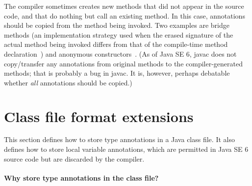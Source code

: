 \documentclass[10pt]{article}
\begin{document}
The compiler sometimes creates new methods that did not appear in the
source code, and that do nothing but call an existing method.  In this
case, annotations should be copied from the method being invoked.
Two examples are bridge methods (an implementation strategy used when the
erased signature of the actual method being invoked differs from that of
the compile-time method declaration~\cite[\S15.12.4.5]{GoslingJSB2005}) and
anonymous constructors~\cite[\S15.9.5.1]{GoslingJSB2005}.
(As of Java SE 6, javac does not copy/transfer any annotations from
original methods to the compiler-generated methods; that is probably a bug
in javac.  It is, however, perhaps debatable whether \emph{all} annotations
should be copied.)


\section{Class file format extensions\label{class-file}}

\newcommand{\RuntimeVisibleAnnotations}{\code{Runtime\-Visible\-Annotations}\xspace}
\newcommand{\RuntimeInvisibleAnnotations}{\code{Runtime\-Invisible\-Annotations}\xspace}
\newcommand{\RuntimeInOrVisibleAnnotations}{\code{Runtime}\-[\code{In}]\code{visible\-Annotations}\xspace}
\newcommand{\RuntimeVisibleParameterAnnotations}{\code{Runtime\-Visible\-Parameter\-Annotations}\xspace}
\newcommand{\RuntimeInvisibleParameterAnnotations}{\code{Runtime\-Invisible\-Parameter\-Annotations}\xspace}
\newcommand{\RuntimeInOrVisibleParameterAnnotations}{\code{Runtime}\-[\code{In}]\code{visible\-Parameter\-Annotations}\xspace}
\newcommand{\RuntimeVisibleTypeAnnotations}{\code{Runtime\-Visible\-Type\-Annotations}\xspace}
\newcommand{\RuntimeInvisibleTypeAnnotations}{\code{Runtime\-Invisible\-Type\-Annotations}\xspace}
\newcommand{\RuntimeInOrVisibleTypeAnnotations}{\code{Runtime}\-[\code{In}]\code{visible\-Type\-Annotations}\xspace}

\newcommand{\extendedannotation}{\code{extend\-ed\-\_anno\-ta\-tion}\xspace}


This section defines how to store type annotations in a Java class file.
It also defines how to store local variable annotations, which are
permitted in Java SE 6 source code but are discarded by the compiler.


\paragraph{Why store type annotations in the class file?}
\end{document}
